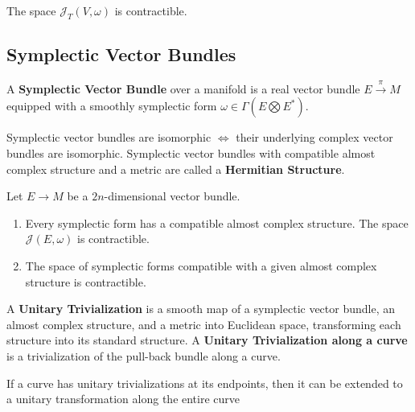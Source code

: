 \begin{prop}

The space $\mathcal{J}_T(V,\omega)$ is contractible.

\end{prop}

\subsection{Symplectic Vector Bundles}

\begin{defn}

A \textbf{Symplectic Vector Bundle} over a manifold is a real vector bundle $E \overset{\pi}{\to} M$ equipped with a smoothly symplectic form $\omega \in \Gamma(E \bigotimes E^*)$. 

\end{defn}

\begin{defn}

Symplectic vector bundles are isomorphic $\iff$ their underlying complex vector bundles are isomorphic. Symplectic vector bundles with compatible almost complex structure and a metric are called a \textbf{Hermitian Structure}.

\end{defn}

\begin{prop}

Let $E \to M$ be a $2n$-dimensional vector bundle.
\begin{enumerate}
    \item Every symplectic form has a compatible almost complex structure. The space $\mathcal{J}(E,\omega)$ is contractible.
    \item The space of symplectic forms compatible with a given almost complex structure is contractible.
\end{enumerate}

\end{prop}

\begin{defn}

A \textbf{Unitary Trivialization} is a smooth map of a symplectic vector bundle, an almost complex structure, and a metric into Euclidean space, transforming each structure into its standard structure. A \textbf{Unitary Trivialization along a curve} is a trivialization of the pull-back bundle along a curve.
\end{defn}

\begin{lem}

If a curve has unitary trivializations at its endpoints, then it can be extended to a unitary transformation along the entire curve

\end{lem}

